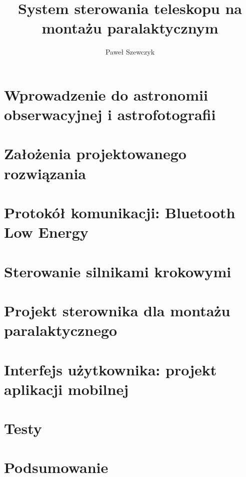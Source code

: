 \documentclass[a4paper,12pt,twoside,openany]{book}
\title{System sterowania teleskopu na montażu paralaktycznym}
\author{Paweł Szewczyk}
\date{}
\begin{document}
\maketitle

\tableofcontents

\chapter{Wprowadzenie do astronomii obserwacyjnej i astrofotografii}


\chapter{Założenia projektowanego rozwiązania}


\chapter{Protokół komunikacji: Bluetooth Low Energy}


\chapter{Sterowanie silnikami krokowymi}


\chapter{Projekt sterownika dla montażu paralaktycznego}


\chapter{Interfejs użytkownika: projekt aplikacji mobilnej}

\chapter{Testy}

\chapter{Podsumowanie}


\end{document}
